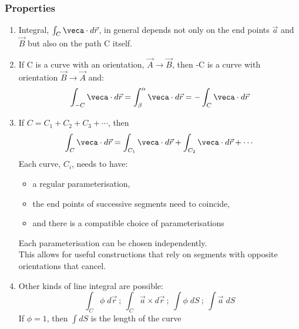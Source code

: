 \documentclass[a4paper, 11pt, normalem]{report}
\begin{document}
\subsection{Properties}
\begin{enumerate}
    \item Integral, $\int_C \veca \cdot d\vec{r}$, in general depends not only on the end points $\vec{a}$ and $\vec{B}$ but also on the path C itself.
    \item If C is a curve with an orientation, $\vec{A} \to \vec{B}$, then -C is a curve with orientation $\vec{B} \to \vec{A}$ and:
            \begin{equation*}
                \int_{-C} \veca \cdot d\vec{r} = \int_{\beta}^{\alpha} \veca \cdot d\vec{r} = -\int_C \veca \cdot d\vec{r}
            \end{equation*}
    \item If $C = C_1 + C_2 + C_3 + \cdots$, then
            \begin{equation*}
                \int_C \veca \cdot d\vec{r} = \int_{C_1} \veca \cdot d\vec{r} + \int_{C_2} \veca \cdot d\vec{r} + \cdots
            \end{equation*}
            Each curve, $C_i$, needs to have:
            \begin{itemize}
                \item a regular parameterisation,
                \item the end points of successive segments need to coincide,
                \item and there is a compatible choice of parameterisations
            \end{itemize}
            Each parameterisation can be chosen independently. \\
            This allows for useful constructions that rely on segments with opposite orientations that cancel.
    \item Other kinds of line integral are possible:
            \begin{equation*}
                \int_C \phi\;d\vec{r} ~;~ \int_C \vec{a} \times d\vec{r} ~;~ \int \phi\;dS ~;~ \int \vec{a}\;dS
            \end{equation*}
            If $\phi = 1$, then $\int dS$ is the length of the curve
\end{enumerate}

\chapter{}
\end{document}
